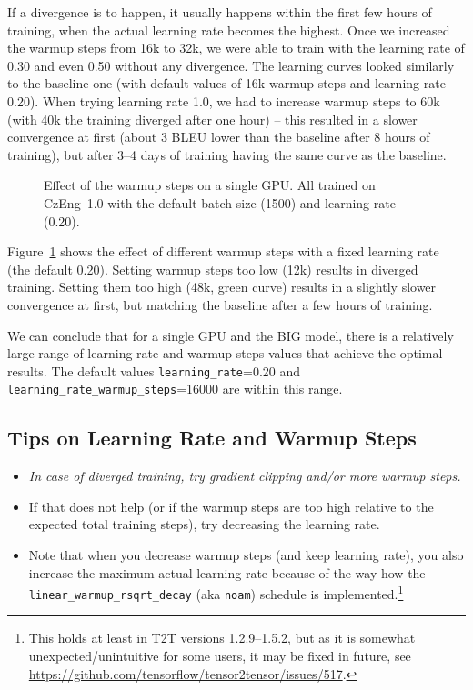 \documentclass{pbmlarxiv} \pdfoutput=1
\def\recommend#1{\textsl{#1}}
\begin{document}
If a divergence is to happen, it usually happens within the first few hours of
training, when the actual learning rate becomes the highest.
Once we increased the warmup steps from 16k to 32k,
 we were able to train with the learning rate of 0.30 and even 0.50 without any divergence.
The learning curves looked similarly to the baseline one
 (with default values of 16k warmup steps and learning rate 0.20).
When trying learning rate 1.0, we had to increase warmup steps to 60k
 (with 40k the training diverged after one hour)
 -- this resulted in a slower convergence at first
 (about 3 BLEU lower than the baseline after 8 hours of training),
 but after 3--4 days of training having the same curve as the baseline.

\begin{figure}
\vspace{-5mm}
\caption{Effect of the warmup steps on a single GPU.
 All trained on CzEng~1.0 with the default batch size (1500) and learning rate (0.20).}
\label{fig:warmup-steps}
\end{figure}

Figure~\ref{fig:warmup-steps} shows the effect of different warmup steps
 with a fixed learning rate (the default 0.20).
Setting warmup steps too low (12k) results in diverged training.
Setting them too high (48k, green curve) results in a slightly slower convergence at first,
 but matching the baseline after a few hours of training.

We can conclude that for a single GPU and the BIG model,
 there is a relatively large range of learning rate and warmup steps values
 that achieve the optimal results.
The default values \verb|learning_rate|=0.20 and \verb|learning_rate_warmup_steps|=16000 are within this range.

\subsection*{Tips on Learning Rate and Warmup Steps}
\begin{itemize}
\item \recommend{In case of diverged training, try gradient clipping and/or more warmup steps.}
\item If that does not help (or if the warmup steps are too high relative to the expected total training steps),
 try decreasing the learning rate.
\item Note that when you decrease warmup steps (and keep learning rate),
 you also increase the maximum actual learning rate
 because of the way how the \texttt{linear\_warmup\_rsqrt\_decay} (aka \texttt{noam}) schedule
 is implemented.\footnote{This holds at least in T2T versions 1.2.9--1.5.2,
  but as it is somewhat unexpected/unintuitive for some users,
  it may be fixed in future, see \url{https://github.com/tensorflow/tensor2tensor/issues/517}.
 } 
\end{itemize}
\end{document}
